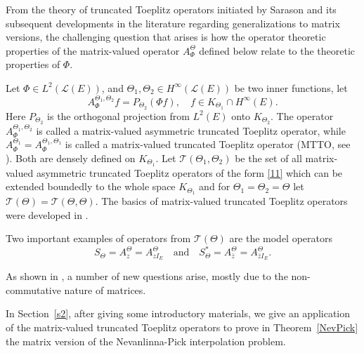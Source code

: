 \documentclass{amsart}
\theoremstyle{definition}
\newcommand{\oL }{\mathcal{L}(E) }
\def\ni{\noindent}
\begin{document}
\medskip


From the theory of truncated Toeplitz operators initiated by Sarason and its subsequent developments in the literature regarding generalizations to matrix versions, the challenging question that arises is how the operator theoretic properties of the matrix-valued operator $A_{\Phi}^{\Theta}$ defined below relate to the theoretic properties of $\Phi$.


\medskip

Let $\Phi\in L^2(\oL)$, and $\Theta_1,\Theta_2\in H^{\infty}(\oL)$ be two inner functions, let
\begin{equation}\label{11}
A_{\Phi}^{\Theta_{1}, \Theta_{2}}f=P_{\Theta_{2}}(\Phi f),\quad f\in K_{\Theta_{1}}\cap H^{\infty}(E).
\end{equation} 
Here $P_{\Theta_2}$ is the orthogonal projection from $L^2(E)$ onto $K_{\Theta_{2}}$.
The operator $A_{\Phi}^{\Theta_{1}, \Theta_{2}}$ is called a matrix-valued asymmetric truncated Toeplitz operator, while $A_{\Phi}^{\Theta_{1}}=A_{\Phi}^{\Theta_{1}, \Theta_{1}}$ is called a matrix-valued truncated Toeplitz operator (MTTO, see \cite{RT}). Both are densely defined on $K_{\Theta_{1}}$. Let $\mathcal{T}(\Theta_{1},\Theta_{2})$ be the set of all matrix-valued asymmetric truncated Toeplitz operators of the form \eqref{11} which can be extended boundedly to the whole space $K_{\Theta_{1}}$ and for $\Theta_{1}=\Theta_{2}=\Theta$ let $\mathcal{T}(\Theta )=\mathcal{T}(\Theta,\Theta)$. The basics of matrix-valued truncated Toeplitz operators were %
developed in \cite{RT}.


 Two important examples of operators from $\mathcal{T}(\Theta )$ are the model operators
$$S_{\Theta}=A_{z }^{\Theta }=A_{zI_{E}}^{\Theta }\quad\text{and}\quad S_{\Theta }^*=A_{\bar z }^{\Theta }=A_{\bar zI_{E}}^{\Theta}.$$

As shown in \cite{sar}, a number of new questions arise, mostly due to the non-commutative nature of matrices.

\medskip




\medskip

\vskip2pt

\ni {\bf Organization of the paper.} %
In Section~\ref{s2}, after giving some introductory materials,  we give an application of the matrix-valued truncated Toeplitz operators to prove in Theorem~\ref{NevPick} the matrix version of the Nevanlinna-Pick interpolation problem. 
\end{document}
